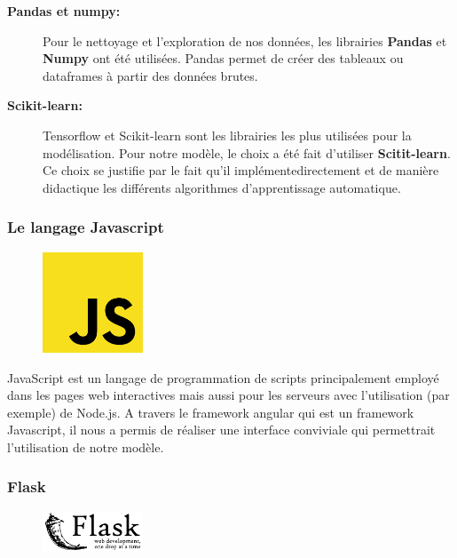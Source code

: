 \begin{description}
  \item[\textbf{Pandas et numpy: }] Pour le nettoyage et l'exploration de nos
      données, les librairies \textbf{Pandas} et \textbf{Numpy} ont été utilisées.
      Pandas permet de créer des tableaux ou dataframes à partir des données
      brutes.
    \item[\textbf{Scikit-learn: }] Tensorflow et Scikit-learn sont les librairies
        les plus utilisées pour la modélisation. Pour notre modèle, le choix a
        été fait d'utiliser \textbf{Scitit-learn}. Ce choix se justifie par le
        fait qu'il implémentedirectement et de manière didactique les différents
        algorithmes d'apprentissage automatique.
    \end{description}
\subsubsection{Le langage Javascript} 

\begin{figure}
  \vspace{-7mm}
  \includegraphics[width=3cm]{images/javascript.png}
\end{figure}
JavaScript est un langage de programmation de scripts principalement employé
dans les pages web interactives mais aussi pour les serveurs avec 
l'utilisation (par exemple) de Node.js. A travers le framework angular qui est
un framework Javascript, il nous a permis de réaliser une interface
conviviale qui permettrait l'utilisation de notre modèle.

\subsubsection{Flask}
\begin{figure}
  \vspace{-7mm}
  \includegraphics[width=3cm]{images/flask.png}
\end{figure}

